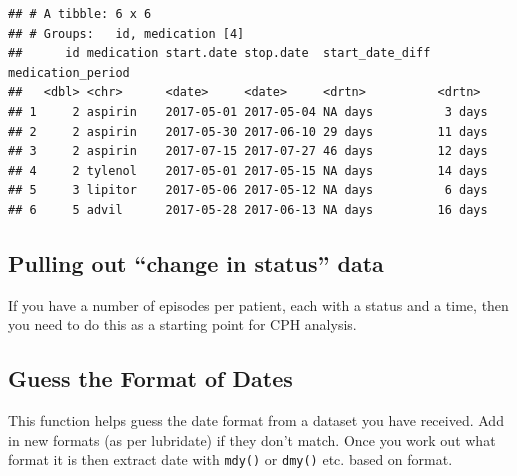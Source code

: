 \documentclass[
]{book}
\begin{document}
\begin{verbatim}
## # A tibble: 6 x 6
## # Groups:   id, medication [4]
##      id medication start.date stop.date  start_date_diff medication_period
##   <dbl> <chr>      <date>     <date>     <drtn>          <drtn>           
## 1     2 aspirin    2017-05-01 2017-05-04 NA days          3 days          
## 2     2 aspirin    2017-05-30 2017-06-10 29 days         11 days          
## 3     2 aspirin    2017-07-15 2017-07-27 46 days         12 days          
## 4     2 tylenol    2017-05-01 2017-05-15 NA days         14 days          
## 5     3 lipitor    2017-05-06 2017-05-12 NA days          6 days          
## 6     5 advil      2017-05-28 2017-06-13 NA days         16 days
\end{verbatim}

\hypertarget{pulling-out-change-in-status-data}{%
\subsection{Pulling out ``change in status'' data}\label{pulling-out-change-in-status-data}}

If you have a number of episodes per patient, each with a status and a time, then you need to do this as a starting point for CPH analysis.

\hypertarget{guess-the-format-of-dates}{%
\subsection{Guess the Format of Dates}\label{guess-the-format-of-dates}}

This function helps guess the date format from a dataset you have received. Add in new formats (as per lubridate) if they don't match. Once you work out what format it is then extract date with \texttt{mdy()} or \texttt{dmy()} etc. based on format.
\end{document}

